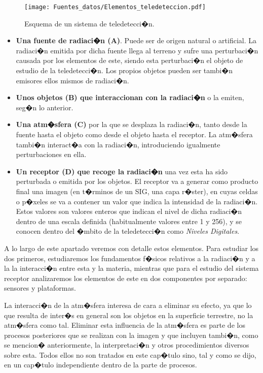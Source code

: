\begin{figure}[!hbt]   
\centering
\texttt{[image: Fuentes\_datos/Elementos\_teledeteccion.pdf]}
\caption{\small Esquema de un sistema de teledetecci�n.}
\label{Fig:Elementos_teledeteccion} 
\end{figure}


\begin{itemize}
	\item \textbf{Una fuente de radiaci�n (A)}. Puede ser de origen natural o artificial. La radiaci�n emitida por dicha fuente llega al terreno y sufre una perturbaci�n causada por los elementos de este, siendo esta perturbaci�n el objeto de estudio de la teledetecci�n. Los propios objetos pueden ser tambi�n emisores ellos mismos de radiaci�n.
	\item \textbf{Unos objetos (B) que interaccionan con la radiaci�n} o la emiten, seg�n lo anterior.
	\item \textbf{Una atm�sfera (C)} por la que se desplaza la radiaci�n, tanto desde la fuente hasta el objeto como desde el objeto hasta el receptor. La atm�sfera tambi�n interact�a con la radiaci�n, introduciendo igualmente perturbaciones en ella.
	\item \textbf{Un receptor (D) que recoge la radiaci�n} una vez esta ha sido perturbada o emitida por los objetos. El receptor va a generar como producto final una imagen (en t�rminos de un SIG, una capa r�ster), en cuyas celdas o p�xeles se va a contener un valor que indica la intensidad de la radiaci�n. Estos valores son valores enteros que indican el nivel de dicha radiaci�n dentro de una escala definida (habitualmente valores entre 1 y 256), y se conocen dentro del �mbito de la teledetecci�n como \emph{Niveles Digitales}.
\end{itemize}

A lo largo de este apartado veremos con detalle estos elementos. Para estudiar los dos primeros, estudiaremos los fundamentos f�sicos relativos a la radiaci�n y a la la interacci�n entre esta y la materia, mientras que para el estudio del sistema receptor analizaremos los elementos de este en dos componentes por separado: sensores y plataformas. 

La interacci�n de la atm�sfera interesa de cara a eliminar su efecto, ya que lo que resulta de inter�s en general son los objetos en la superficie terrestre, no la atm�sfera como tal. Eliminar esta influencia de la atm�sfera es parte de los procesos posteriores que se realizan con la imagen y que incluyen tambi�n, como se mencion� anteriormente, la interpretaci�n y otros procedimientos diversos sobre esta. Todos ellos no son tratados en este cap�tulo sino, tal y como se dijo, en un cap�tulo independiente dentro de la parte de procesos.

